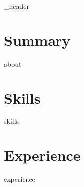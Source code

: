\documentclass[letterpaper,14pt]{article}
\begin{document}
{_header}\label{sec:header}

\vspace*{4pt}

\section{Summary}\label{sec:about}
\vspace*{4pt}
{about}
\vspace*{2pt}

\section{Skills}\label{sec:skills}
\vspace*{4pt}
{skills}
\vspace*{2pt}

\section{Experience}\label{sec:experience}
\vspace*{8pt}
{experience}
\end{document}
